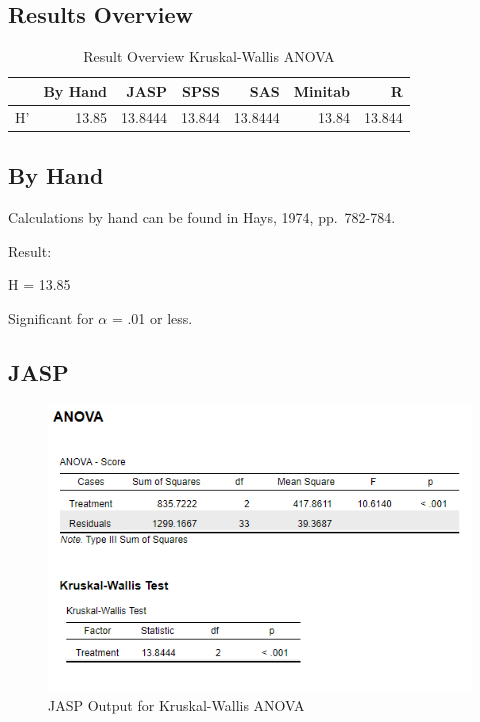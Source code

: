 \documentclass[
]{book}
\begin{document}
\hypertarget{results-overview-2}{%
\subsection{Results Overview}\label{results-overview-2}}

\begin{table}

\caption{\label{tab:unnamed-chunk-50}Result Overview Kruskal-Wallis ANOVA}
\centering
\begin{tabular}[t]{lrrrrrr}
\toprule
  & By Hand & JASP & SPSS & SAS & Minitab & R\\
\midrule
H' & 13.85 & 13.8444 & 13.844 & 13.8444 & 13.84 & 13.844\\
\bottomrule
\end{tabular}
\end{table}

\hypertarget{by-hand-2}{%
\subsection{By Hand}\label{by-hand-2}}

Calculations by hand can be found in Hays, 1974, pp.~782-784.

Result:

H = 13.85

Significant for \(\alpha\) = .01 or less.

\hypertarget{jasp-2}{%
\subsection{JASP}\label{jasp-2}}

\begin{figure}[!h]
\includegraphics{Screenshots/Kruskal-Wallis ANOVA/kwaJASP} \caption{\label{fig:kwaJASP}JASP Output for Kruskal-Wallis ANOVA}\label{fig:kwaJASP}
\end{figure}
\end{document}
